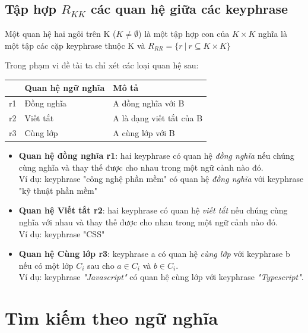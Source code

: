 \subsection{Tập hợp $R_{KK}$ các quan hệ giữa các keyphrase}
Một quan hệ hai ngôi trên K ($K \neq \emptyset $) là một tập hợp con của $K \times K$ nghĩa là một tập các cặp keyphrase thuộc K và $R_{RR} = \{ r\ |\ r \subseteq K \times K \}$

Trong phạm vi đề tài ta chỉ xét các loại quan hệ sau:

\begin{table}[H]
\centering
\begin{tabular}{|l|l|l|}
\hline
\textbf{} & \textbf{Quan hệ ngữ nghĩa} & \textbf{Mô tả}           \\ \hline
r1        & Đồng nghĩa                 & A đồng nghĩa với B       \\ \hline
r2        & Viết tắt                   & A là dạng viết tắt của B \\ \hline
r3        & Cùng lớp                   & A cùng lớp với B         \\ \hline
\end{tabular}
\end{table}

\begin{itemize}
    \item \textbf{Quan hệ đồng nghĩa r1}: hai keyphrase có quan hệ \textit{đồng nghĩa} nếu chúng cùng nghĩa và thay thế được cho nhau trong một ngữ cảnh nào đó. \\ 
    Ví dụ: keyphrase "công nghệ phần mềm" có quan hệ \textit{đồng nghĩa} với keyphrase "kỹ thuật phần mềm"
    \item \textbf{Quan hệ Viết tắt r2}: hai keyphrase có quan hệ \textit{viết tắt} nếu chúng cùng nghĩa với nhau và thay thế được cho nhau trong một ngữ cảnh nào đó. \\
    Ví dụ: keyphrase "CSS" 
    \item \textbf{Quan hệ Cùng lớp r3}: keyphrase a có quan hệ \textit{cùng lớp} với keyphrase b nếu có một lớp $C_{i}$ sau cho $a \in C_{i}$ và $b \in C_{i}$. \\
    Ví dụ: keyphrase \textit{"Javascript"} có quan hệ cùng lớp với keyphrase \textit{"Typescript"}.
\end{itemize}

\section{Tìm kiếm theo ngữ nghĩa}

